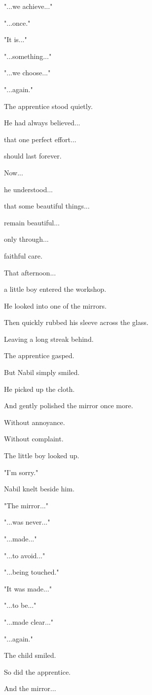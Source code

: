 \documentclass[12pt,openany]{book}
\begin{document}
"...we achieve..."

"...once."

"It is..."

"...something..."

"...we choose..."

"...again."

The apprentice stood quietly.

He had always believed...

that one perfect effort...

should last forever.

Now...

he understood...

that some beautiful things...

remain beautiful...

only through...

faithful care.

That afternoon...

a little boy entered the workshop.

He looked into one of the mirrors.

Then quickly rubbed his sleeve across the glass.

Leaving a long streak behind.

The apprentice gasped.

But Nabil simply smiled.

He picked up the cloth.

And gently polished the mirror once more.

Without annoyance.

Without complaint.

The little boy looked up.

"I'm sorry."

Nabil knelt beside him.

"The mirror..."

"...was never..."

"...made..."

"...to avoid..."

"...being touched."

"It was made..."

"...to be..."

"...made clear..."

"...again."

The child smiled.

So did the apprentice.

And the mirror...
\end{document}
